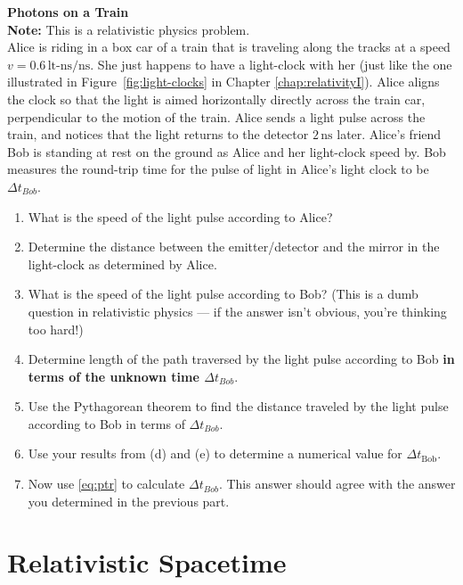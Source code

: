 \begin{exercise}\textbf{Photons on a Train}\\
\textbf{Note:} This is a relativistic physics problem.\\ Alice is riding
in a box car of a train that is traveling along the tracks at a speed
$v=0.6\,\text{lt-ns/ns}$.  She just happens to have a light-clock with her
(just like the one illustrated in Figure~\ref{fig:light-clocks} in Chapter
\ref{chap:relativityI}).  Alice aligns the clock so that the light
is aimed horizontally directly across the train car, perpendicular to
the motion of the train.  Alice sends a light pulse across the train,
and notices that the light returns to the detector $2\,\text{ns}$ later.
Alice's friend Bob is standing at rest on the ground as Alice and her
light-clock speed by.  Bob measures the round-trip time for the pulse
of light in Alice's light clock to be $\Delta t_{ Bob}$.
\begin{enumerate}
\item What is the speed of the light pulse according to Alice?
\item Determine the distance between the emitter/detector and the mirror
in the light-clock as determined by Alice.
\item  What is the speed of the light pulse according to Bob?  (This is
a dumb question in relativistic physics --- if the answer isn't obvious,
you're thinking too hard!)
\item Determine length of the path traversed by the light pulse according
to Bob \textbf{in terms of the unknown time $\Delta t_{ Bob}$}.
\item Use the Pythagorean theorem  to find the distance
  traveled by the light pulse according to Bob in terms of $\Delta t_{ Bob}$. 
\item Use your results from (d) and (e) to determine
a numerical value for $\Delta t_\text{Bob}$.

\item Now use \eqref{eq:ptr} to calculate $\Delta t_{ Bob}$.
This answer should agree with the answer you determined in the previous
part.
\end{enumerate}
\end{exercise}



\chapter{Relativistic Spacetime}
\label{chap:relativistic_spacetime}


